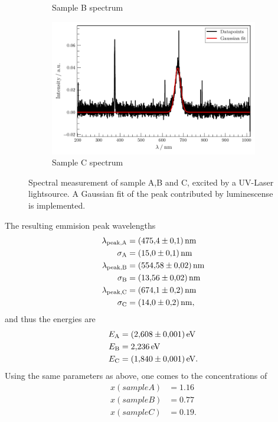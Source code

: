 \begin{figure}
\begin{subfigure}{.3\textwidth}
    \caption{Sample B spectrum}
\end{subfigure}
\begin{subfigure}{.3\textwidth}
    \centering
    \includegraphics[width=\textwidth]{plots/Samp_C_D_UV.pdf}
  \caption{Sample C spectrum}
\end{subfigure}
\caption{Spectral measurement of sample A,B and C, excited by a UV-Laser lightsource. A Gaussian fit of the peak contributed by luminescense is implemented.}
\end{figure}\label{fig:UV-sample-spectra}

The resulting emmision peak wavelengths 
\begin{align*}
    \lambda_\text{peak,A} &= \SI{475.4 \pm 0.1}{\nano\meter} \\
    \sigma_\text{A} &= \SI{15.0 \pm 0.1}{\nano\meter} \\
    \lambda_\text{peak,B} &= \SI{554.58 \pm 0.02}{\nano\meter} \\
    \sigma_\text{B} &= \SI{13.56 \pm 0.02}{\nano\meter} \\
    \lambda_\text{peak,C} &= \SI{674.1 \pm 0.2}{\nano\meter} \\
    \sigma_\text{C} &= \SI{14.0 \pm 0.2}{\nano\meter}, \\
\end{align*}
and thus the energies are
\begin{align*}
    E_\text{A} &= \SI{2.608 \pm 0.001}{\eV} \\
    E_\text{B} &= \SI{2.236 \pm 0.000}{\eV} \\
    E_\text{C} &= \SI{1.840 \pm 0.001}{\eV}. \\
\end{align*}
Using the same parameters as above, one comes to the concentrations of
\begin{align*}
    x(sample A) &= \num{1.16}\\
    x(sample B) &= \num{0.77}\\
    x(sample C) &= \num{0.19}.\\
\end{align*}

